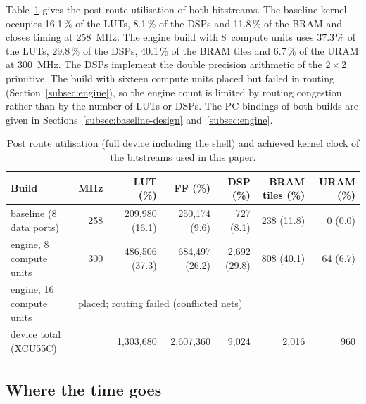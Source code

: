 \documentclass[pdflatex,sn-mathphys-num]{sn-jnl}
\newcommand{\NumBramPctFlagship}{40.1}
\newcommand{\NumBramPctVsix}{11.8}
\newcommand{\NumClockFlagship}{300}
\newcommand{\NumClockVsix}{258}
\newcommand{\NumDspPctFlagship}{29.8}
\newcommand{\NumDspPctVsix}{8.1}
\newcommand{\NumEnginesFlagship}{8}
\newcommand{\NumLutPctFlagship}{37.3}
\newcommand{\NumLutPctVsix}{16.1}
\newcommand{\NumUramPctFlagship}{6.7}
\theoremstyle{thmstyleone}
\theoremstyle{thmstylethree}
\begin{document}
Table~\ref{tab:resources} gives the post route utilisation of both bitstreams. The baseline kernel occupies
\NumLutPctVsix\,\% of the LUTs, \NumDspPctVsix\,\% of the DSPs and \NumBramPctVsix\,\% of the BRAM and closes timing at
\NumClockVsix~MHz. The engine build with \NumEnginesFlagship~compute units uses \NumLutPctFlagship\,\% of the LUTs,
\NumDspPctFlagship\,\% of the DSPs, \NumBramPctFlagship\,\% of the BRAM tiles and \NumUramPctFlagship\,\% of the URAM at \NumClockFlagship~MHz. The DSPs
implement the double precision arithmetic of the $2\times2$ primitive. The build with sixteen compute units placed but
failed in routing (Section~\ref{subsec:engine}), so the engine count is limited by routing congestion rather than by the
number of LUTs or DSPs. The PC bindings of both builds are
given in Sections~\ref{subsec:baseline-design} and~\ref{subsec:engine}.

\begin{table}[t]
\caption{Post route utilisation (full device including the shell) and achieved kernel clock of the bitstreams
used in this paper.}\label{tab:resources}
\begin{tabular}{@{}lrrrrrr@{}}
\toprule
Build & MHz & LUT (\%) & FF (\%) & DSP (\%) & BRAM tiles (\%) & URAM (\%) \\
\midrule
baseline (8 data ports) & 258 & 209{,}980 (16.1) & 250{,}174 (9.6) & 727 (8.1) & 238 (11.8) & 0 (0.0) \\
engine, 8 compute units & 300 & 486{,}506 (37.3) & 684{,}497 (26.2) & 2{,}692 (29.8) & 808 (40.1) & 64 (6.7) \\
engine, 16 compute units & \multicolumn{6}{l}{placed; routing failed (conflicted nets)} \\
device total (XCU55C) & & 1{,}303{,}680 & 2{,}607{,}360 & 9{,}024 & 2{,}016 & 960 \\
\bottomrule
\end{tabular}
\end{table}

\subsection{Where the time goes}\label{subsec:res-breakdown}
\end{document}
